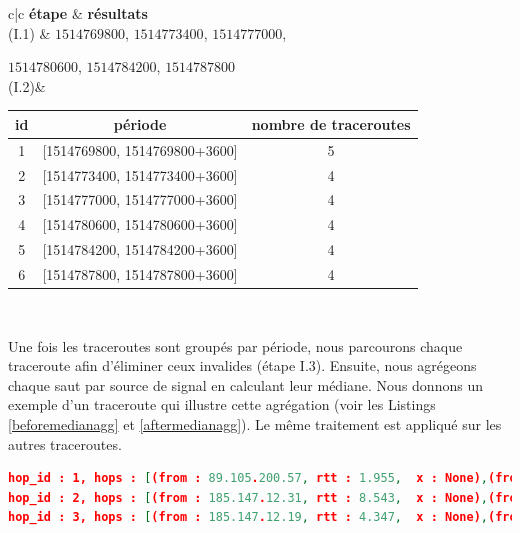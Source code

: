 
\begin{table}[H]
	\centering
	\begin{tabular}{c|c}
		\textbf{étape} &  \textbf{résultats}	\\ \hline
		(I.1) &   $ 1514769800 $, $ 1514773400 $, $ 1514777000 $,
		
		$ 1514780600 $, $ 1514784200 $, $ 1514787800 $\\ \hline
		(I.2)& 
		\begin{tabular}{ccc}
			\textbf{id}&	\textbf{période}&\textbf{nombre de traceroutes} \\ \hline
			1&	[1514769800, 1514769800+3600] & 5\\ \hline
			2&	[1514773400, 1514773400+3600] & 4\\ \hline
			3&	[1514777000, 1514777000+3600] & 4\\ \hline
			4&	[1514780600, 1514780600+3600] &4 \\ \hline
			5&	[1514784200, 1514784200+3600] &4 \\ \hline
			6&	[1514787800, 1514787800+3600] & 4 \\ \hline
		\end{tabular}\\ \hline
	\end{tabular}
\end{table}

Une fois les traceroutes sont groupés par période, nous parcourons chaque traceroute afin d'éliminer ceux invalides (étape  I.3). 
Ensuite, nous agrégeons chaque saut par source de signal en calculant leur médiane. Nous donnons un exemple d'un traceroute qui illustre cette agrégation (voir les Listings \ref{beforemedianagg} et \ref{aftermedianagg}). Le même traitement est appliqué sur les autres traceroutes. 

\begin{lstlisting}[language=json,firstnumber=1, caption={Les sauts du traceroute T7 (sans agrégation)}, basicstyle=\footnotesize, label=beforemedianagg]
hop_id : 1, hops : [(from : 89.105.200.57, rtt : 1.955,  x : None),(from : 89.105.200.57, rtt : 1.7, x : None),(from : 89.105.200.57, rtt : 1.709,  x : None)]
hop_id : 2, hops : [(from : 185.147.12.31, rtt : 8.543,  x : None),(from : 185.147.12.31, rtt : 4.103, x : None),(from : 185.147.12.31, rtt : 4.41, x : None)]
hop_id : 3, hops : [(from : 185.147.12.19, rtt : 4.347,  x : None),(from : 185.147.12.19, rtt : 2.876, x : None),(from : 185.147.12.19, rtt : 3.143, x : None )]
\end{lstlisting}

